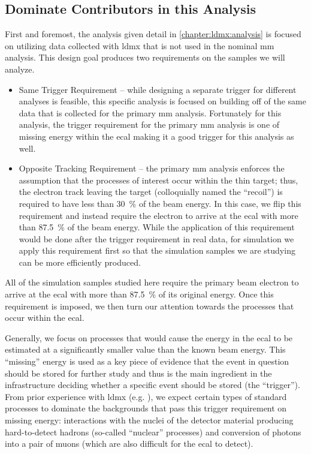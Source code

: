 \subsection{Dominate Contributors in this Analysis}
First and foremost, the analysis given detail in \cref{chapter:ldmx:analysis} is focused
on utilizing data collected with \ac{ldmx} that is not used in the nominal \ac{mm} analysis.
This design goal produces two requirements on the samples we will analyze.
\begin{itemize}
  \item Same Trigger Requirement -- while designing a separate trigger for different analyses
        is feasible, this specific analysis is focused on building off of the same data that
        is collected for the primary \ac{mm} analysis.
        Fortunately for this analysis, the trigger requirement for the primary \ac{mm} analysis
        is one of missing energy within the \ac{ecal} making it a good trigger for this analysis
        as well.
  \item Opposite Tracking Requirement -- the primary \ac{mm} analysis enforces the assumption that
        the processes of interest occur within the thin target; thus, the electron track leaving
        the target (colloquially named the ``recoil'') is required to have less than
        \qty{30}{\percent} of the beam energy. In this case, we flip this requirement and instead
        require the electron to arrive at the \ac{ecal} with more than \qty{87.5}{\percent} of the
        beam energy. While the application of this requirement would be done after the trigger
        requirement in real data, for simulation we apply this requirement first so that the
        simulation samples we are studying can be more efficiently produced.
\end{itemize}
All of the simulation samples studied here require the primary beam electron to arrive
at the \ac{ecal} with more than \qty{87.5}{\percent} of its original energy.
Once this requirement is imposed, we then turn our attention towards the processes
that occur within the \ac{ecal}.

Generally, we focus on processes that would cause the energy in the \ac{ecal} to be
estimated at a significantly smaller value than the known beam energy.
This ``missing'' energy is used as a key piece of evidence that the event in question
should be stored for further study and thus is the main ingredient in the infrastructure
deciding whether a specific event should be stored (the ``trigger'').
From prior experience with \ac{ldmx} (e.g. \cite{ldmx-whitepaper,ldmx-photon-reject-2020}),
we expect certain types of standard processes to dominate the backgrounds that pass this
trigger requirement on missing energy: interactions with the nuclei of the detector
material producing hard-to-detect hadrons (so-called ``nuclear'' processes) and conversion
of photons into a pair of muons (which are also difficult for the \ac{ecal} to detect).


